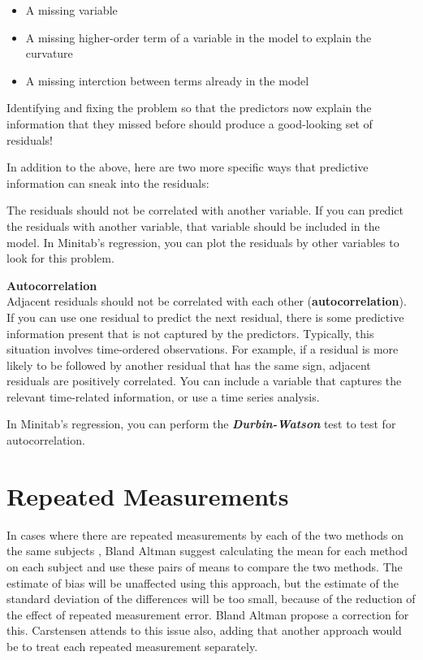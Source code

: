 \documentclass[12pt, a4paper]{report}
\theoremstyle{plain}
\theoremstyle{definition}
\theoremstyle{remark}
\begin{document}
	\begin{itemize}
		\item A missing variable
		\item A missing higher-order term of a variable in the model to explain the curvature
		\item A missing interction between terms already in the model
	\end{itemize}
	
	
	Identifying and fixing the problem so that the predictors now explain the information that they missed before should produce a good-looking set of residuals!
	
	In addition to the above, here are two more specific ways that predictive information can sneak into the residuals:
	
	The residuals should not be correlated with another variable. If you can predict the residuals with another variable, that variable should be included in the model. In Minitab’s regression, you can plot the residuals by other variables to look for this problem.
	
	\noindent \textbf{Autocorrelation} \\
	Adjacent residuals should not be correlated with each other (\textbf{autocorrelation}). If you can use one residual to predict the next residual, there is some predictive information present that is not captured by the predictors. Typically, this situation involves time-ordered observations. For example, if a residual is more likely to be followed by another residual that has the same sign, adjacent residuals are positively correlated. You can include a variable that captures the relevant time-related information, or use a time series analysis. 
	
	In Minitab’s regression, you can perform the \textbf{\textit{Durbin-Watson} }test to test for autocorrelation.
	
	\section{Repeated Measurements}
	
	In cases where there are repeated measurements by each of the two
	methods on the same subjects , Bland Altman suggest calculating
	the mean for each method on each subject and use these pairs of
	means to compare the two methods.
	The estimate of bias will be unaffected using this approach, but
	the estimate of the standard deviation of the differences will be
	too small, because of the reduction of the effect of repeated
	measurement error. Bland Altman propose a correction for this.
	Carstensen attends to this issue also, adding that another
	approach would be to treat each repeated measurement separately.
	
\end{document}
